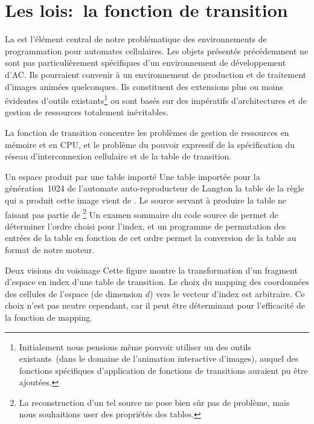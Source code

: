 \section{Les lois:~la fonction de transition}

La  est l'élément central de notre
problématique des environnements de programmation pour automates
cellulaires. %
Les objets présentés précédemment ne sont pas particulièrement
spécifiques d'un environnement de développement d'AC\@. %
Ils pourraient convenir à un environnement de production et de
traitement d'images animées quelconques. %
Ils constituent des extensions plus ou moins évidentes d'outils
existants\footnote{%
  Initialement nous pensions même pouvoir utiliser un des outils
  existants~(dans le domaine de l'animation interactive d'images),
  auquel des fonctions spécifiques d'application de fonctions de
  transitions auraient pu être ajoutées.} %
ou sont basés sur des impératifs d'architectures et de gestion de
ressources totalement inévitables. %

La fonction de transition concentre les problèmes de gestion de
ressources en mémoire et en CPU, et le problème du pouvoir expressif
de la spécification du réseau d'interconnexion cellulaire et de la
table de transition. %

%
{Un espace produit par une table importé}%
{Une table importée pour la génération~1024 de l'automate auto-reproducteur de Langton}%
{la table de la règle~ qui a produit cette image vient de
  . %
  Le source servant à produire la table ne faisant pas partie de
  \footnote{%
    La reconstruction d'un tel source ne pose bien sûr pas de
    problème, mais nous souhaitions user des propriétés des tables.} %
  Un examen sommaire du code source de  permet de
  déterminer l'ordre choisi pour l'index, et un programme de
  permutation des entrées de la table en fonction de cet ordre permet
  la conversion de la table au format de notre moteur.}

%
{}%
{Deux visions du voisinage}%
{Cette figure montre la transformation d'un fragment
  d'espace en index d'une table de transition. %
  Le choix du mapping des coordonnées des cellules de l'espace
  (de dimension $d$) vers le vecteur d'index est arbitraire. %
  Ce choix n'est pas neutre cependant, car il peut être déterminant pour
  l'efficacité de la fonction de mapping. %
  }

